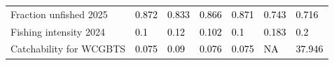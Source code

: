 \documentclass[
]{article}
\begin{document}
\begin{landscape}
\begin{longtable}[t]{ll>{\raggedright\arraybackslash}p{5em}>{\raggedright\arraybackslash}p{5em}>{\raggedright\arraybackslash}p{5em}>{\raggedright\arraybackslash}p{5em}>{\raggedright\arraybackslash}p{5em}}
\hspace{1em}Fraction unfished 2025 & \textcolor{black}{0.872} & \textcolor{black}{0.833} & \textcolor{black}{0.866} & \textcolor{black}{0.871} & \textcolor{black}{0.743} & \textcolor{black}{0.716}\\
\hspace{1em}Fishing intensity 2024 & \textcolor{black}{0.1} & \textcolor{black}{0.12} & \textcolor{black}{0.102} & \textcolor{black}{0.1} & \textcolor{black}{0.183} & \textcolor{black}{0.2}\\
\hspace{1em}Catchability for WCGBTS & \textcolor{black}{0.075} & \textcolor{black}{0.09} & \textcolor{black}{0.076} & \textcolor{black}{0.075} & \textcolor{black}{NA} & \textcolor{black}{37.946}\\
\bottomrule

\end{longtable}

\endgroup{}


\end{landscape}

\newpage{}
\end{document}
